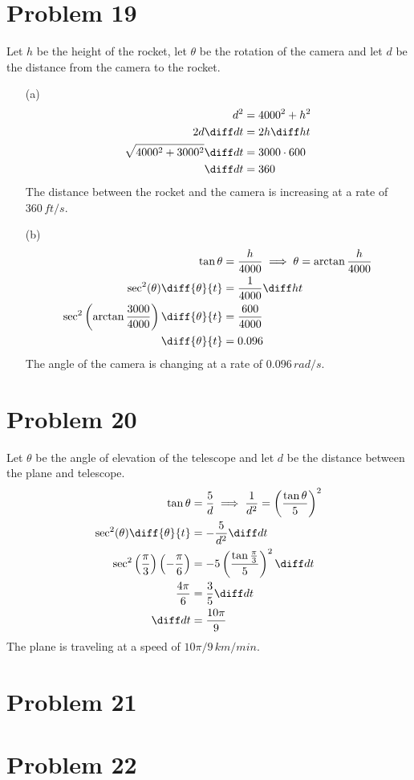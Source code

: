 \documentclass[preview, margin=0.6in]{standalone}
\newcommand*{\paren}[1]{\ensuremath\left(#1\right)}
\newcommand*{\problem}[1]{\section*{Problem #1}}
\begin{document}
\problem{19}
Let $h$ be the height of the rocket, let $\theta$ be the rotation of the camera and let $d$ be the distance from the camera to the rocket.

\begin{itemize}
	\item[(a)]
	\begin{align*}
		d^2&=4000^2+h^2 \\
		2d\diff dt&=2h\diff ht \\
		\sqrt{4000^2+3000^2}\diff dt&=3000\cdot600 \\
		\diff dt&=360
	\end{align*}
	The distance between the rocket and the camera is increasing at a rate of $360\,ft/s$.
	
	\item[(b)]
	\begin{align*}
		\tan\theta&=\frac{h}{4000} \implies \theta=\arctan\frac{h}{4000} \\
		\sec^2(\theta)\diff{\theta}{t}&=\frac{1}{4000}\diff ht \\
		\sec^2\paren{\arctan\frac{3000}{4000}}\diff{\theta}{t}&=\frac{600}{4000} \\
		\diff{\theta}{t}&=0.096
	\end{align*}
	The angle of the camera is changing at a rate of $0.096\,rad/s$.
\end{itemize}

\problem{20}
Let $\theta$ be the angle of elevation of the telescope and let $d$ be the distance between the plane and telescope.
\begin{align*}
	\tan\theta&=\frac{5}{d} \implies \frac{1}{d^2}=\paren{\frac{\tan\theta}{5}}^2 \\
	\sec^2(\theta)\diff{\theta}{t}&=-\frac{5}{d^2}\diff dt \\
	\sec^2\paren{\frac{\pi}{3}}\paren{-\frac{\pi}{6}}&=-5\paren{\frac{\tan\frac{\pi}{3}}{5}}^2\diff dt \\
	\frac{4\pi}{6}&=\frac35\diff dt \\
	\diff dt&=\frac{10\pi}{9}
\end{align*}
The plane is traveling at a speed of $10\pi/9\,km/min$.

\problem{21}


\problem{22}
\end{document}
